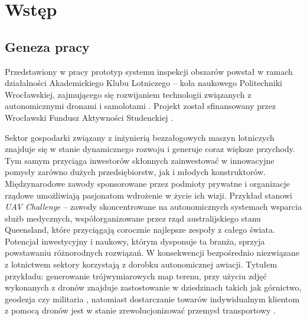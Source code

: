 \chapter{Wstęp} \label{chapter_intro}


\section{Geneza pracy} \label{intro_genesis}

Przedstawiony w pracy prototyp systemu inspekcji obszarów powstał w ramach działalności
Akademickiego Klubu Lotniczego -- koła naukowego Politechniki Wrocławskiej, zajmującego
się rozwijaniem technologii związanych z autonomicznymi dronami i samolotami
\cite{akl_home_page}. Projekt został sfinansowany przez Wrocławski Fundusz
Aktywności Studenckiej \cite{fast_webpage}.

Sektor gospodarki związany z inżynierią bezzałogowych maszyn lotniczych znajduje się
w stanie dynamicznego rozwoju i generuje coraz większe przychody.
Tym samym przyciąga inwestorów skłonnych zainwestować w innowacyjne pomysły zarówno 
dużych przedsiębiorstw, jak i młodych konstruktorów. Międzynarodowe zawody sponsorowane
przez podmioty prywatne i organizacje rządowe umożliwiają pasjonatom wdrożenie w życie
ich wizji. Przykład stanowi \textit{UAV Challenge} -- zawody skoncentrowane na
autonomicznych systemach wsparcia służb medycznych, współorganizowane przez rząd
australijskiego stanu Queensland, które przyciągają corocznie najlepsze zespoły z całego
świata\cite{uav_sponsors}. Potencjał inwestycyjny i naukowy, którym dysponuje ta branża,
sprzyja powstawaniu różnorodnych rozwiązań. W konsekwencji bezpośrednio niezwiązane z
lotnictwem sektory korzystają z dorobku autonomicznej awiacji. Tytułem przykładu: 
generowanie trójwymiarowych map terenu, przy użyciu zdjęć wykonanych z dronów znajduje
zastostowanie w dziedzinach takich jak górnictwo, geodezja czy militaria
\cite{uav_photogrametry}, natomiast dostarczanie towarów indywidualnym klientom z pomocą
dronów jest w stanie zrewolucjonizować przemysł transportowy \cite{prime_air}.


